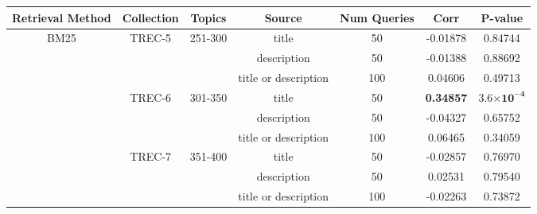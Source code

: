 %
\begin{table*}[hbt!]
  \centering
  \begin{tabular}{| c || c | c | c | c || c | c |}
    \hline
    Retrieval Method & Collection & Topics & Source & Num Queries & Corr & P-value\\
    \hline
    \multirow{12}{*}{BM25}
    &   \multirow{3}{*}{TREC-5}
        & \multirow{3}{*}{251-300}
            &   title & 50 & -0.01878 & 0.84744\\
    &   &   &   description & 50 & -0.01388 & 0.88692\\
    &   &   &   title or description & 100 & 0.04606 & 0.49713\\
    \cline{2-7}
    &   \multirow{3}{*}{TREC-6}
        &   \multirow{3}{*}{301-350}
            &   title & 50 & \textbf{0.34857} & $\boldsymbol{3.6}\boldsymbol{\times}\boldsymbol{10}^{\boldsymbol{-4}}$\\
    &   &   &   description & 50 & -0.04327 & 0.65752\\
    &   &   &   title or description & 100 & 0.06465 & 0.34059\\
    \cline{2-7}
    &   \multirow{3}{*}{TREC-7}
        &   \multirow{3}{*}{351-400}
            &   title & 50 & -0.02857 & 0.76970\\
    &   &   &   description & 50 & 0.02531 & 0.79540\\
    &   &   &   title or description & 100 & -0.02263 & 0.73872\\

\end{tabular}
\end{table*}
